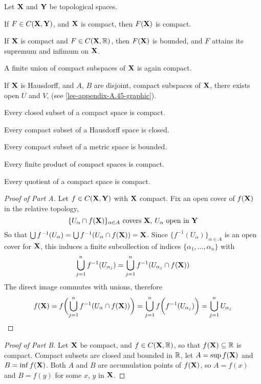 \documentclass[../main-manifolds.tex]{subfiles}
\begin{document}
\begin{wts}\label{lee-appendix-A.45}
Let ${\mathbf{X}}$ and ${\mathbf{Y}}$ be topological spaces.
\begin{enumalpha}
    \item If $F\in C({\mathbf{X}},{\mathbf{Y}})$, and ${\mathbf{X}}$ is compact, then $F({\mathbf{X}})$ is compact.
    \item If ${\mathbf{X}}$ is compact and $F\in C({\mathbf{X}},\mathbb{R})$, then $F({\mathbf{X}})$ is bounded, and $F$ attains its supremum and infimum on ${\mathbf{X}}$.
    \item A finite union of compact subspaces of ${\mathbf{X}}$ is again compact.
    \item If ${\mathbf{X}}$ is Hausdorff, and $A$, $B$ are disjoint, compact subspaces of ${\mathbf{X}}$, there exists open $U$ and $V$, (see \cref{lee-appendix-A.45-graphic}).
    
    \item Every closed subset of a compact space is compact.
    \item Every compact subset of a Hausdorff space is closed.
    \item Every compact subset of a metric space is bounded.
    \item Every finite product of compact spaces is compact.
    \item Every quotient of a compact space is compact.
\end{enumalpha}
\end{wts}
\newpage
\begin{proof}[Proof of  Part A]
    Let $f\in C({\mathbf{X}},{\mathbf{Y}})$ with ${\mathbf{X}}$ compact. Fix an open cover of $f({\mathbf{X}})$ in the relative topology, 
    \[
        \{U_\alpha\cap f({\mathbf{X}})\}_{\alpha\in A}\text{ covers }{\mathbf{X}},\: U_\alpha\text{ open in }{\mathbf{Y}}
    \]    
    So that $\bigcup f^{-1}(U_\alpha) = \bigcup f^{-1}(U_\alpha\cap f({\mathbf{X}}))={\mathbf{X}}$. Since $\{f^{-1}(U_\alpha)\}_{\alpha\in A}$ is an open cover for ${\mathbf{X}}$, this induces a finite subcollection of indices $\{\alpha_1,\ldots,\alpha_n\}$ with
    \[
        \bigcup_{j=1}^nf^{-1}(U_{\alpha_j}) = \bigcup_{j=1}^nf^{-1}(U_{\alpha_j}\cap f({\mathbf{X}}))
    \]
    The direct image commutes with unions, therefore
    \[
        f({\mathbf{X}})=f\biggl(\bigcup_{j=1}^nf^{-1}(U_\alpha\cap f({\mathbf{X}}))\biggr) = \bigcup_{j=1}^nf\biggl(f^{-1}(U_{\alpha_j})\biggr) = \bigcup_{j=1}^n U_{\alpha_j}
    \]
\end{proof}


\begin{proof}[Proof of  Part B]
    Let ${\mathbf{X}}$ be compact, and $f\in C({\mathbf{X}},\mathbb{R})$, so that $f({\mathbf{X}})\subseteq\mathbb{R}$ is compact. Compact subsets are closed and bounded in $\mathbb{R}$, let $A = \sup f({\mathbf{X}})$ and $B = \inf f({\mathbf{X}})$. Both $A$ and $B$ are accumulation points of $f({\mathbf{X}})$, so $A = f(x)$ and $B = f(y)$ for some $x$, $y$ in ${\mathbf{X}}$.
\end{proof}
\end{document}
